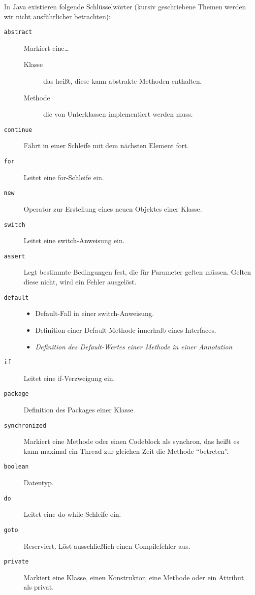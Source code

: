 	In Java existieren folgende Schlüsselwörter (kursiv geschriebene Themen werden wir nicht ausführlicher betrachten):
	\begin{description}
        \item[\texttt{abstract}] Markiert eine\dots
	        \begin{description}
	        	\item[Klasse] das heißt, diese kann abstrakte Methoden enthalten.
	        	\item[Methode] die von Unterklassen implementiert werden muss.
	        \end{description}
        \item[\texttt{continue}] Fährt in einer Schleife mit dem nächsten Element fort.
        \item[\texttt{for}] Leitet eine for-Schleife ein.
        \item[\texttt{new}] Operator zur Erstellung eines neuen Objektes einer Klasse.
        \item[\texttt{switch}] Leitet eine switch-Anweisung ein.
        \item[\texttt{assert}] Legt bestimmte Bedingungen fest, die für Parameter gelten müssen. Gelten diese nicht, wird ein Fehler ausgelöst.
        \item[\texttt{default}]
	        \begin{itemize}
	        	\item Default-Fall in einer switch-Anweisung.
	        	\item Definition einer Default-Methode innerhalb eines Interfaces.
	        	\item \textit{Definition des Default-Wertes einer Methode in einer Annotation}
	        \end{itemize}
        \item[\texttt{if}] Leitet eine if-Verzweigung ein.
        \item[\texttt{package}] Definition des Packages einer Klasse.
        \item[\texttt{synchronized}] Markiert eine Methode oder einen Codeblock als synchron, das heißt es kann maximal ein Thread zur gleichen Zeit die Methode \enquote{betreten}.
        \item[\texttt{boolean}] Datentyp.
        \item[\texttt{do}] Leitet eine do-while-Schleife ein.
        \item[\texttt{goto}] Reserviert. Löst ausschließlich einen Compilefehler aus.
        \item[\texttt{private}] Markiert eine Klasse, einen Konstruktor, eine Methode oder ein Attribut als privat.

\end{description}
